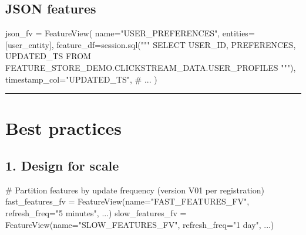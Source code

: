 \documentclass[
  letterpaper,
  DIV=11,
  numbers=noendperiod]{scrreprt}
\newenvironment{Shaded}{\begin{snugshade}}{\end{snugshade}}
\newcommand{\CommentTok}[1]{\textcolor[rgb]{0.37,0.37,0.37}{#1}}
\newcommand{\NormalTok}[1]{\textcolor[rgb]{0.00,0.23,0.31}{#1}}
\newcommand{\OperatorTok}[1]{\textcolor[rgb]{0.37,0.37,0.37}{#1}}
\newcommand{\StringTok}[1]{\textcolor[rgb]{0.13,0.47,0.30}{#1}}
\begin{document}
\hypertarget{json-features}{%
\subsection{JSON features}\label{json-features}}

\begin{Shaded}
\begin{Highlighting}[]
\NormalTok{json\_fv }\OperatorTok{=}\NormalTok{ FeatureView(}
\NormalTok{    name}\OperatorTok{=}\StringTok{"USER\_PREFERENCES"}\NormalTok{,}
\NormalTok{    entities}\OperatorTok{=}\NormalTok{[user\_entity],}
\NormalTok{    feature\_df}\OperatorTok{=}\NormalTok{session.sql(}\StringTok{"""}
\StringTok{        SELECT}
\StringTok{            USER\_ID,}
\StringTok{            PREFERENCES,}
\StringTok{            UPDATED\_TS}
\StringTok{        FROM FEATURE\_STORE\_DEMO.CLICKSTREAM\_DATA.USER\_PROFILES}
\StringTok{    """}\NormalTok{),}
\NormalTok{    timestamp\_col}\OperatorTok{=}\StringTok{"UPDATED\_TS"}\NormalTok{,}
    \CommentTok{\# ...}
\NormalTok{)}
\end{Highlighting}
\end{Shaded}

\begin{center}\rule{0.5\linewidth}{0.5pt}\end{center}

\hypertarget{best-practices-10}{%
\section{Best practices}\label{best-practices-10}}

\hypertarget{design-for-scale}{%
\subsection{1. Design for scale}\label{design-for-scale}}

\begin{Shaded}
\begin{Highlighting}[]
\CommentTok{\# Partition features by update frequency (version V01 per registration)}
\NormalTok{fast\_features\_fv }\OperatorTok{=}\NormalTok{ FeatureView(name}\OperatorTok{=}\StringTok{"FAST\_FEATURES\_FV"}\NormalTok{, refresh\_freq}\OperatorTok{=}\StringTok{"5 minutes"}\NormalTok{, ...)}
\NormalTok{slow\_features\_fv }\OperatorTok{=}\NormalTok{ FeatureView(name}\OperatorTok{=}\StringTok{"SLOW\_FEATURES\_FV"}\NormalTok{, refresh\_freq}\OperatorTok{=}\StringTok{"1 day"}\NormalTok{, ...)}
\end{Highlighting}
\end{Shaded}
\end{document}
